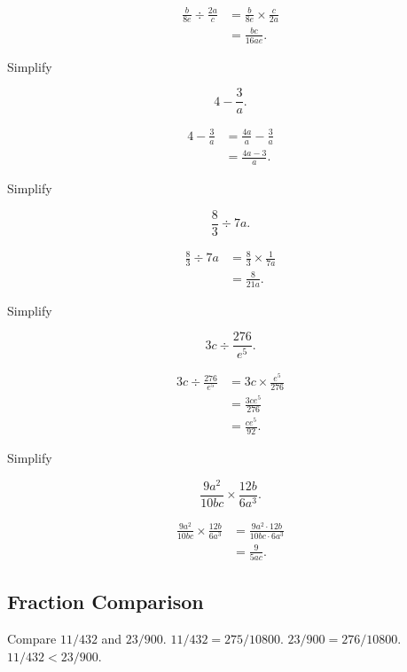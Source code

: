 \documentclass[8pt]{article}
\begin{document}
			\begin{align*}
				\frac{b}{8e} \div \frac{2a}{c} &= \frac{b}{8e} \times \frac{c}{2a}\\
				&= \frac{bc}{16ae}.
			\end{align*}

			\prob Simplify
			
			\[4 - \frac{3}{a}.\]

			\solution
			
			\begin{align*}
				4 - \frac{3}{a} &= \frac{4a}{a} - \frac{3}{a}\\
				                &= \frac{4a-3}{a}.
			\end{align*}
			
			\prob Simplify

			\[\frac{8}{3} \div 7a.\]

			\solution
			
			\begin{align*}
				\frac{8}{3} \div 7a &= \frac{8}{3} \times \frac{1}{7a}\\
				&= \frac{8}{21a}.
			\end{align*}

			\prob Simplify
			
			\[3c \div \frac{276}{e^5}.\]

			\solution

			\begin{align*}
				3c \div \frac{276}{e^5} &= 3c \times \frac{e^5}{276}\\
				&= \frac{3ce^5}{276}\\
				&= \frac{ce^5}{92}.
			\end{align*}

			\prob Simplify
			
			\[\frac{9a^2}{10bc} \times \frac{12b}{6a^3}.\]

			\solution
			
			\begin{align*}
				\frac{9a^2}{10bc} \times \frac{12b}{6a^3} &= \frac{9a^2 \cdot 12b}{10bc \cdot 6a^3}\\
				&= \frac{9}{5ac}.
			\end{align*}

		\subsection{Fraction Comparison}

			\exmp {} Compare \(11/432\) and \(23/900\). \(11/432 = 275/10800\). \(23/900 = 276/10800\). \(11/432 < 23/900\).
\end{document}
